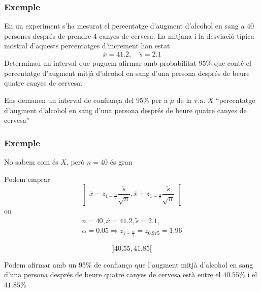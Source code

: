 \documentclass[12pt,t]{beamer}
\renewcommand{\emph}[1]{{\color{red}#1}}
\theoremstyle{plain}
\theoremstyle{definition}
\begin{document}
%
%
%
%
%
%




\begin{frame}
\frametitle{Exemple}
\vspace*{-2ex}

En un experiment s'ha mesurat el percentatge d'augment d'alcohol en sang a 40 persones després de prendre 4 canyes de cervesa. La mitjana i la desviació típica mostral d'aquests percentatges d'increment han estat
$$
\overline{x}=41.2,\quad \widetilde{s}=2.1
$$
Determinau un interval que puguem afirmar amb probabilitat 95\% que conté el  percentatge d'augment mitjà d'alcohol en sang d'una persona després de beure quatre canyes de cervesa.
\medskip


Ens demanen un \emph{interval de confiança del 95\%} per a $\mu$ de la v.a. $X$ ``percentatge d'augment d'alcohol en sang d'una persona després de beure quatre canyes de cervesa''


\end{frame}


\begin{frame}
\frametitle{Exemple}

No sabem com és $X$, però $n=40$ és gran
\medskip

Podem emprar
$$
\left]\overline{x}-z_{1-\frac{\alpha}{2}}\frac{\widetilde{s}}{\sqrt{n}},
    \overline{x}+z_{1-\frac{\alpha}{2}}\frac{\widetilde{s}}{\sqrt{n}}\right[
$$
on
$$
\begin{array}{c}
n=40,\overline{x}=41.2,\widetilde{s}=2.1,\\[1ex]
\alpha=0.05\Rightarrow z_{1-\frac{\alpha}{2}}=z_{0.975}=1.96
\end{array}
$$

$$
]40.55, 41.85[
$$
\medskip

Podem afirmar amb un 95\% de confiança que l'augment mitjà d'alcohol en sang d'una persona després de beure quatre canyes de cervesa està entre el $40.55\%$ i el $41.85\%$


\end{frame}
\end{document}
